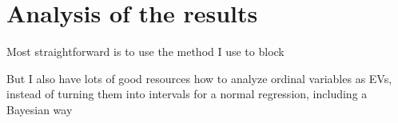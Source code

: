\section*{Analysis of the results}
	\begin{coi}
		\item Most straightforward is to use the method I use to block
		\item But I also have lots of good resources how to analyze ordinal variables as EVs, instead of turning them into intervals for a normal regression, including a Bayesian way
	\end{coi}




